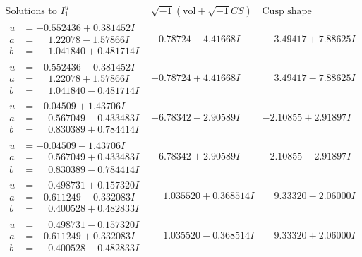 \documentclass[1p]{elsarticle_modified}
\theoremstyle{definition}
\newcommand{\I}{\sqrt{-1}}
\begin{document}
$$\begin{array}{c|c|c}  
\text{Solutions to }I^u_{1}& \I (\text{vol} + \sqrt{-1}CS) & \text{Cusp shape}\\
 \hline 
\begin{aligned}
u &= -0.552436 + 0.381452 I \\
a &= \phantom{-}1.22078 - 1.57866 I \\
b &= \phantom{-}1.041840 + 0.481714 I\end{aligned}
 & -0.78724 - 4.41668 I & \phantom{-}3.49417 + 7.88625 I \\ \hline\begin{aligned}
u &= -0.552436 - 0.381452 I \\
a &= \phantom{-}1.22078 + 1.57866 I \\
b &= \phantom{-}1.041840 - 0.481714 I\end{aligned}
 & -0.78724 + 4.41668 I & \phantom{-}3.49417 - 7.88625 I \\ \hline\begin{aligned}
u &= -0.04509 + 1.43706 I \\
a &= \phantom{-}0.567049 - 0.433483 I \\
b &= \phantom{-}0.830389 + 0.784414 I\end{aligned}
 & -6.78342 - 2.90589 I & -2.10855 + 2.91897 I \\ \hline\begin{aligned}
u &= -0.04509 - 1.43706 I \\
a &= \phantom{-}0.567049 + 0.433483 I \\
b &= \phantom{-}0.830389 - 0.784414 I\end{aligned}
 & -6.78342 + 2.90589 I & -2.10855 - 2.91897 I \\ \hline\begin{aligned}
u &= \phantom{-}0.498731 + 0.157320 I \\
a &= -0.611249 - 0.332083 I \\
b &= \phantom{-}0.400528 + 0.482833 I\end{aligned}
 & \phantom{-}1.035520 + 0.368514 I & \phantom{-}9.33320 - 2.06000 I \\ \hline\begin{aligned}
u &= \phantom{-}0.498731 - 0.157320 I \\
a &= -0.611249 + 0.332083 I \\
b &= \phantom{-}0.400528 - 0.482833 I\end{aligned}
 & \phantom{-}1.035520 - 0.368514 I & \phantom{-}9.33320 + 2.06000 I \\ \hline\begin{aligned}

\end{aligned}
\end{array}$$
\end{document}
